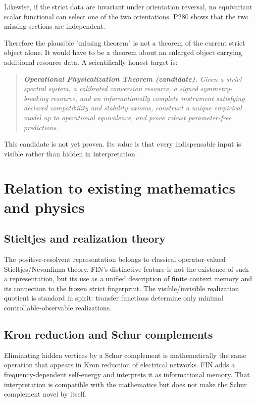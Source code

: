 \documentclass[11pt,a4paper,openany]{report}
\begin{document}
Likewise, if the strict data are invariant under orientation reversal, no equivariant scalar functional can select one of the two orientations. P280 shows that the two missing sections are independent.

Therefore the plausible "missing theorem" is not a theorem of the current strict object alone. It would have to be a theorem about an enlarged object carrying additional resource data. A scientifically honest target is:

\begin{quote}\itshape
\textbf{Operational Physicalization Theorem (candidate).} Given a strict spectral system, a calibrated conversion resource, a signed symmetry-breaking resource, and an informationally complete instrument satisfying declared compatibility and stability axioms, construct a unique empirical model up to operational equivalence, and prove robust parameter-free predictions.

\end{quote}

This candidate is not yet proven. Its value is that every indispensable input is visible rather than hidden in interpretation.

\chapter{Relation to existing mathematics and physics}

\section{Stieltjes and realization theory}

The positive-resolvent representation belongs to classical operator-valued Stieltjes/\allowbreak{}Nevanlinna theory. FIN's distinctive feature is not the existence of such a representation, but its use as a unified description of finite context memory and its connection to the frozen strict fingerprint. The visible/\allowbreak{}invisible realization quotient is standard in spirit: transfer functions determine only minimal controllable-observable realizations.

\section{Kron reduction and Schur complements}

Eliminating hidden vertices by a Schur complement is mathematically the same operation that appears in Kron reduction of electrical networks. FIN adds a frequency-dependent self-energy and interprets it as informational memory. That interpretation is compatible with the mathematics but does not make the Schur complement novel by itself.
\end{document}
